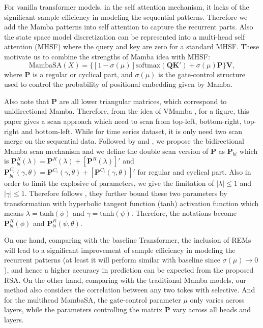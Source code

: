 For vanilla transformer models, in the self attention mechanism, it lacks of the significant sample efficiency in modeling the sequential patterns. Therefore we add the Mamba patterns into self attention to capture the recurrent parts. Also the state space model discretization can be represented into a multi-head self attention (MHSF) where the query and key are zero for a standard MHSF. These motivate us to combine the strengths of Mamba idea with MHSF:
\begin{equation}
\label{eq:MHSF}
    \text{MambaSA}(X)=\{[1-\sigma(\mu)]\text{softmax}(\boldsymbol{QK}')+\sigma(\mu)\textbf{P}\}\boldsymbol{V},
\end{equation}
where $\textbf{P}$ is a regular or cyclical part, and $\sigma(\mu)$ is the gate-control structure used to control the probability of positional embedding given by Mamba.

Also note that $\textbf{P}$ are all lower triangular matrices, which correspond to unidirectional Mamba. Therefore, from the idea of VMamba \citep{liu2024vmamba}, for a figure, this paper gives a scan approach which need to scan from top-left, bottom-right, top-right and bottom-left. While for time series dataset, it is only need two scan merge on the sequential data. Followed by \citet{huang2022encoding} and \citet{liu2024vmamba}, we propose the bidirectional Mamba scan mechanism and we define the double scan version of $\textbf{P}$ as $\textbf{P}_{bi}$ which is $\textbf{P}^R_{bi}(\lambda)=\textbf{P}^R(\lambda)+[\textbf{P}^R(\lambda)]'$ and $\textbf{P}^{C_i}_{bi}(\gamma,\theta)=\textbf{P}^{C_i}(\gamma,\theta)+[\textbf{P}^{C_i}(\gamma,\theta)]'$ for regular and cyclical part. Also in order to limit the explosive of parameters, we give the limitation of $|\lambda| \leq 1$ and $|\gamma| \leq 1$. Therefore follows \citet{huang2022encoding}, they further bound these two parameters by transformation with hyperbolic tangent function (tanh) activation function which means $\lambda = \text{tanh}(\phi)$ and $\gamma = \text{tanh}(\psi)$. Therefore, the notations become $\textbf{P}_{bi}^R(\phi)$ and $\textbf{P}_{bi}^R(\psi,\theta)$.

On one hand, comparing with the baseline Transformer, the inclusion of REMs
will lead to a significant improvement of sample efficiency in modeling the recurrent patterns (at least it will perform similar with baseline since $\sigma(\mu) \rightarrow 0$), and hence a higher accuracy in prediction can be expected from the proposed RSA. On the other hand, comparing with the traditional Mamba models, our method also considers the correlation between any two tokes with selective. And for the multihead MambaSA, the gate-control parameter $\mu$ only varies across layers, while the parameters controlling the matrix $\textbf{P}$ vary across all heads and layers.

